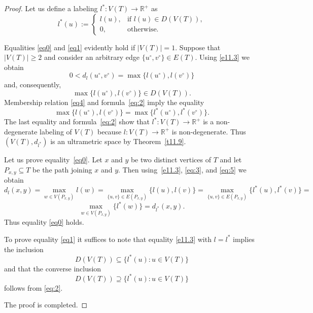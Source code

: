 \documentclass{article}
\begin{document}
\begin{proof}
Let us define a labeling $l^*\colon V(T)\to \mathbb{R}^+$ as
\begin{equation}
l^*(u):=
\begin{cases}
l(u), & \text{if}\,\, l(u)\in D(V(T)),\\
0, & \text{otherwise}.
\end{cases}
\label{eq:2}
\end{equation}

Equalities \eqref{eq0} and \eqref{eq1} evidently hold if $|V(T)|=1$. Suppose that $|V(T)|\geq 2$ and consider an arbitrary edge $\{u^\circ,v^\circ\}\in E(T)$.
Using \eqref{e11.3}  we obtain
\begin{equation}
0<d_l(u^\circ,v^\circ)=\max\{l(u^\circ),l(v^\circ)\}
\label{eq:3}
\end{equation}
and, consequently,
\begin{equation}
    \label{eq4}
    \max\{l(u^\circ),l(v^\circ)\} \in D(V(T)).
\end{equation}
Membership relation \eqref{eq4} and formula~\eqref{eq:2} imply the equality
\begin{equation}
\max\{l(u^\circ),l(v^\circ)\}=\max\{l^*(u^\circ),l^*(v^\circ)\}.
\label{eq:5}
\end{equation}
The last equality and formula~\eqref{eq:2} show that
$l^*\colon  V(T)\to\mathbb{R}^+$ is a non-degenerate labeling of $V(T)$ because $l \colon V(T) \to \mathbb R^+$ is non-degenerate.
Thus $(V(T),d_{l^*})$ is an ultrametric space by Theorem~\ref{t11.9}.

Let us prove equality~\eqref{eq0}.
Let $x$ and $y$ be two distinct vertices of $T$ and let $P_{x,y}\subseteq T$
be the path joining $x$ and $y$.
Then using~\eqref{e11.3}, \eqref{eq:3}, and \eqref{eq:5} we obtain
\[
d_l(x,y)=\max_{w \in V(P_{x,y})} l(w)
        =\max_{\{u,v\}\in E(P_{x,y})} \{l(u),l(v)\}=\max_{\{u,v\}\in E(P_{x,y})} \{l^*(u),l^*(v)\}=
\]
\[
\max_{w \in V(P_{x,y})} \{ l^{*}(w) \}
=
d_{l^{*}}(x,y).
\]
Thus equality \eqref{eq0} holds.

To prove equality \eqref{eq1} it suffices to note that
equality \eqref{e11.3} with $l=l^*$ implies the inclusion
\[
D(V(T)) \subseteq \{ l^{*}(u) : u \in V(T) \}
\]
and that the converse inclusion
\[
D(V(T)) \supseteq \{ l^{*}(u) : u \in V(T) \}
\]
follows from \eqref{eq:2}.

The proof is completed. 
\end{proof}
\end{document}
